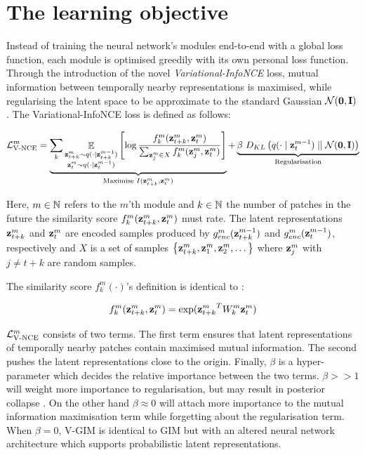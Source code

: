 	
		
\section{The learning objective}
	Instead of training the neural network's modules end-to-end with a global loss function, each module is optimised greedily with its own personal loss function. Through the introduction of the novel \textit{Variational-InfoNCE} loss, mutual information between temporally nearby representations is maximised, while regularising the latent space to be approximate to the standard Gaussian $\mathcal{N}(\bm{\mathbf{0}}, \mathbf{I})$. The Variational-InfoNCE loss is defined as follows:
	
	\begin{equation} %
		\Lvnce^m =
		\underbrace{\reconstrgim}_{\text{Maximise } I(\ztk^m, \zt^m)} + \underbrace{\beta ~ \latentspaceconstraintgim}_{\text{Regularisation}}
		\label{eq:variational_gim_loss}
	\end{equation}

	Here, $m \in \mathbb{N}$ refers to the $m$'th module and $k \in \mathbb{N}$ the number of patches in the future the similarity score $f_k^m(\mathbf{z}_{t+k}^m,\mathbf{z}_t^m)$ must rate. The latent representations $\mathbf{z}_{t+k}^m$ and $\mathbf{z}_t^m$ are encoded samples produced by $g_{enc}^m(\mathbf{z}_{t+k}^{m-1})$ and $g_{enc}^m(\mathbf{z}_t^{m-1})$, respectively and $X$ is a set of samples ${ \left\{ \mathbf{z}_{t+k}^m, \mathbf{z}_1^m, \mathbf{z}_2^m, \dots \right\} }$ where $\mathbf{z}_j^m$ with $j \neq t \! + \! k$ are random samples.


	The similarity score $f_k^m(\cdot)$'s definition is identical to \cite{lowePuttingEndEndtoEnd2020}:
	
	$$ f_k^m(\mathbf{z}_{t+k}^m,\mathbf{z}_t^m) = \exp({\mathbf{z}_{t+k}^m}^TW_k^m\mathbf{z}_t^m) $$
	
	
	$\mathcal{L}_{\text{V-NCE}}^m$ consists of two terms. The first term ensures that latent representations of temporally nearby patches contain maximised mutual information. The second pushes the latent representations close to the origin. Finally, $\beta$ is a hyper-parameter which decides the relative importance between the two terms. $\beta >> 1$ will weight more importance to regularisation, but may result in posterior collapse \cite{lucasUnderstandingPosteriorCollapse2022}. On the other hand $\beta \approx 0$ will attach more importance to the mutual information maximisation term while forgetting about the regularisation term. When $\beta = 0$, V-GIM is identical to GIM but with an altered neural network architecture which supports probabilistic latent representations.
	
